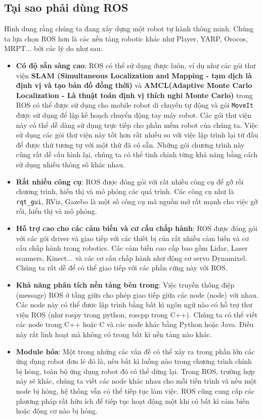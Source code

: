\subsection{Tại sao phải dùng ROS}

Hình dung rằng chúng ta đang xây dựng một robot tự hành thông minh. Chúng ta lựa chọn ROS hơn là các nền tảng robotic khác như Player, YARP, Orocos, MRPT... bởi các lý do như sau:
\begin{itemize}
	\item \textbf{Có độ sẵn sàng cao}: ROS có thể sử dụng được luôn, ví dụ như các gói thư viện \textbf{SLAM (Simultaneous Localization and Mapping - tạm dịch là định vị và tạo bản đồ đồng thời)} và \textbf{AMCL(Adaptive Monte Carlo Localization - Là thuật toán định vị thích nghi Monte Carlo)} trong ROS có thể được sử dụng cho mobile robot di chuyển tự động và gói {\tt MoveIt} được sử dụng để lập kế hoạch chuyển động tay máy robot. Các gói thư viện này có thể dễ dàng sử dụng trực tiếp cho phần mềm robot của chúng ta. Việc sử dụng các gói thư viện này tốt hơn rất nhiều so với việc lập trình lại từ đầu để được thứ tương tự với một thứ đã có sẵn. Những gói chương trình này cũng rất dễ cấu hình lại, chúng ta có thể tinh chỉnh từng khả năng bằng cách sử dụng nhiều thông số khác nhau.
	\item \textbf{Rất nhiều công cụ}: ROS được đóng gói với rất nhiều công cụ để gỡ rối chương trình, hiển thị và mô phỏng các quá trình. Các công cụ như là {\tt rqt\_gui}, RViz, Gazebo là một số công cụ mã nguồn mở rất mạnh cho việc gỡ rối, hiển thị và mô phỏng. 
	\item \textbf{Hỗ trợ cao cho các cảm biến và cơ cấu chấp hành}: ROS được đóng gói với các gói driver và giao tiếp với các thiết bị của rất nhiều cảm biến và cơ cấu chấp hành trong robotics. Các cảm biến cao cấp bao gồm Lidar, Laser scanners, Kinect... và các cơ cấu chấp hành như động cơ servo Dynamixel. Chúng ta rất dễ để có thể giao tiếp với các phần cứng này với ROS. 
	\item \textbf{Khả năng phân tích nền tảng bên trong}: Việc truyền thông điệp (message) ROS ở tầng giữa cho phép giao tiếp giữa các node (node) với nhau. Các node này có thể đươc lập trình bằng bất kì ngôn ngữ nào có hỗ trợ thư viện ROS (như rospy trong python, roscpp trong C++). Chúng ta có thể viết các node trong C++ hoặc C và các node khác bằng Python hoặc Java. Điều này rất linh hoạt mà không có trong bất kì nền tảng nào khác.
	\item \textbf{Module hóa}: Một trong những các vấn đề có thể xảy ra trong phần lớn các ứng dụng robot đơn lẻ đó là, nếu bất kì luồng nào trong chương trình chính bị hỏng, toàn bộ ứng dụng robot đó có thể dừng lại. Trong ROS, trường hợp này sẽ khác, chúng ta viết các node khác nhau cho mỗi tiến trình và nếu một node bị hỏng, hệ thống vẫn có thể tiếp tục làm việc. ROS cũng cung cấp các phương pháp rất hữu ích để tiếp tục hoạt động một khi có bất kì cảm biến hoặc động cơ nào bị hỏng.

\end{itemize}
